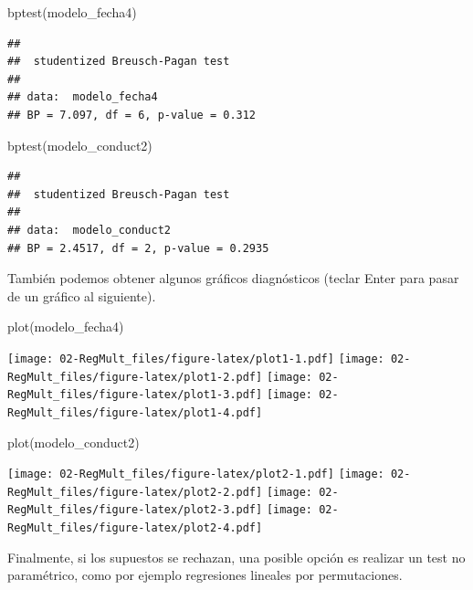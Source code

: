 \documentclass[
]{book}
\newenvironment{Shaded}{\begin{snugshade}}{\end{snugshade}}
\newcommand{\FunctionTok}[1]{\textcolor[rgb]{0.00,0.00,0.00}{#1}}
\newcommand{\NormalTok}[1]{#1}
\begin{document}
\begin{Shaded}
\begin{Highlighting}[]
\FunctionTok{bptest}\NormalTok{(modelo\_fecha4)}
\end{Highlighting}
\end{Shaded}

\begin{verbatim}
## 
##  studentized Breusch-Pagan test
## 
## data:  modelo_fecha4
## BP = 7.097, df = 6, p-value = 0.312
\end{verbatim}

\begin{Shaded}
\begin{Highlighting}[]
\FunctionTok{bptest}\NormalTok{(modelo\_conduct2)}
\end{Highlighting}
\end{Shaded}

\begin{verbatim}
## 
##  studentized Breusch-Pagan test
## 
## data:  modelo_conduct2
## BP = 2.4517, df = 2, p-value = 0.2935
\end{verbatim}

También podemos obtener algunos gráficos diagnósticos (teclar Enter para pasar de un gráfico al siguiente).

\begin{Shaded}
\begin{Highlighting}[]
\FunctionTok{plot}\NormalTok{(modelo\_fecha4)}
\end{Highlighting}
\end{Shaded}

\texttt{[image: 02-RegMult\_files/figure-latex/plot1-1.pdf]} \texttt{[image: 02-RegMult\_files/figure-latex/plot1-2.pdf]} \texttt{[image: 02-RegMult\_files/figure-latex/plot1-3.pdf]} \texttt{[image: 02-RegMult\_files/figure-latex/plot1-4.pdf]}

\begin{Shaded}
\begin{Highlighting}[]
\FunctionTok{plot}\NormalTok{(modelo\_conduct2)}
\end{Highlighting}
\end{Shaded}

\texttt{[image: 02-RegMult\_files/figure-latex/plot2-1.pdf]} \texttt{[image: 02-RegMult\_files/figure-latex/plot2-2.pdf]} \texttt{[image: 02-RegMult\_files/figure-latex/plot2-3.pdf]} \texttt{[image: 02-RegMult\_files/figure-latex/plot2-4.pdf]}

Finalmente, si los supuestos se rechazan, una posible opción es realizar un test no paramétrico, como por ejemplo regresiones lineales por permutaciones.
\end{document}
